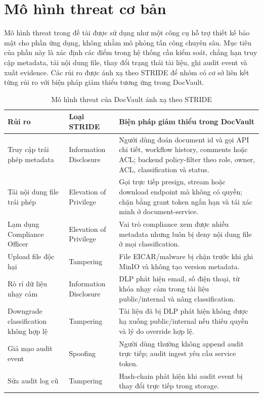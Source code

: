 \section{Mô hình threat cơ bản}

Mô hình threat trong đề tài được sử dụng như một công cụ hỗ trợ thiết kế bảo mật cho phần ứng dụng, không nhằm mô phỏng tấn công chuyên sâu. Mục tiêu của phần này là xác định các điểm trong hệ thống cần kiểm soát, chẳng hạn truy cập metadata, tải nội dung file, thay đổi trạng thái tài liệu, ghi audit event và xuất evidence. Các rủi ro được ánh xạ theo STRIDE để nhóm có cơ sở liên kết từng rủi ro với biện pháp giảm thiểu tương ứng trong DocVault.

\begin{table}[H]
\centering
\small
\caption{Mô hình threat của DocVault ánh xạ theo STRIDE}
\label{tab:threat-model-stride}
\begin{tabularx}{\textwidth}{p{}p{}Y}
\toprule
\textbf{Rủi ro} & \textbf{Loại STRIDE} & \textbf{Biện pháp giảm thiểu trong DocVault} \\
\midrule
Truy cập trái phép metadata & Information Disclosure & Người dùng đoán document id và gọi API chi tiết, workflow history, comments hoặc ACL; backend policy-filter theo role, owner, ACL, classification và status. \\
\addlinespace
Tải nội dung file trái phép & Elevation of Privilege & Gọi trực tiếp presign, stream hoặc download endpoint mà không có quyền; chặn bằng grant token ngắn hạn và tái xác minh ở document-service. \\
\addlinespace
Lạm dụng Compliance Officer & Elevation of Privilege & Vai trò compliance xem được nhiều metadata nhưng luôn bị deny nội dung file ở mọi classification. \\
\addlinespace
Upload file độc hại & Tampering & File EICAR/malware bị chặn trước khi ghi MinIO và không tạo version metadata. \\
\addlinespace
Rò rỉ dữ liệu nhạy cảm & Information Disclosure & DLP phát hiện email, số điện thoại, từ khóa nhạy cảm trong tài liệu public/internal và nâng classification. \\
\addlinespace
Downgrade classification không hợp lệ & Tampering & Tài liệu đã bị DLP phát hiện không được hạ xuống public/internal nếu thiếu quyền và lý do override hợp lệ. \\
\addlinespace
Giả mạo audit event & Spoofing & Người dùng thường không append audit trực tiếp; audit ingest yêu cầu service token. \\
\addlinespace
Sửa audit log cũ & Tampering & Hash-chain phát hiện khi audit event bị thay đổi trực tiếp trong storage. \\
\bottomrule
\end{tabularx}
\end{table}

